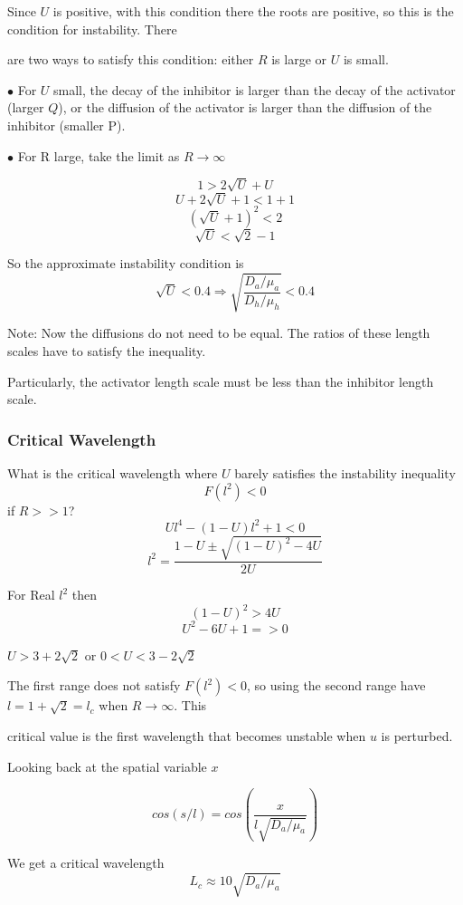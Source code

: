 \documentclass[]{article}
\numberwithin{equation}{section}		%
\begin{document}
Since $U$ is positive, with this condition there the roots are positive, so this is the condition for instability.  There

are two ways to satisfy this condition: either $R$ is large or $U$ is small.


\begin{list}{\leftmargin=2em}
\item$\bullet$ For $U$ small, the decay of the inhibitor is larger than the decay of the activator (larger $Q$), or the diffusion of the activator is larger than the diffusion of the inhibitor (smaller P).
\item$\bullet$ For R large, take the limit as $R\rightarrow\infty$
\end{list}
$$1>2\sqrt{U}+U$$
$$U+2\sqrt{U}+1<1+1$$
$$(\sqrt{U}+1)^2<2$$
$$\sqrt{U}<\sqrt{2}-1$$

\indent\indent So the approximate instability condition is
$$\sqrt{U}<0.4\Rightarrow\sqrt{\frac{D_a/\mu_a}{D_h/\mu_h}}<0.4$$

Note: Now the diffusions do not need to be equal.  The ratios of these length scales have to satisfy the inequality.

Particularly, the activator length scale must be less than the inhibitor length scale.

\subsubsection{Critical Wavelength}
What is the critical wavelength where $U$ barely satisfies the instability inequality $$F(l^2)<0$$ if $R>>1$?
$$Ul^4-(1-U)l^2+1<0$$
$$l^2=\frac{1-U\pm\sqrt{(1-U)^2-4U}}{2U}$$

For Real $l^2$ then
$$(1-U)^2>4U$$
$$U^2-6U+1=>0$$
\begin{center}
$U>3+2\sqrt{2}$\hspace{0.1in} or\hspace{0.1in}  $0<U<3-2\sqrt{2}$
\end{center}

The first range does not satisfy $F(l^2)<0$, so using the second range have $l=1+\sqrt{2}=l_c$ when $R\rightarrow\infty$.  This

critical value is the first wavelength that becomes unstable when $u$ is perturbed.


Looking back at the spatial variable $x$

$$cos\left(s/l\right)=cos\left(\frac{x}{l\sqrt{D_a/\mu_a}}\right)$$

We get a critical wavelength $$L_c\approx10\sqrt{D_a/\mu_a}$$
\end{document}
